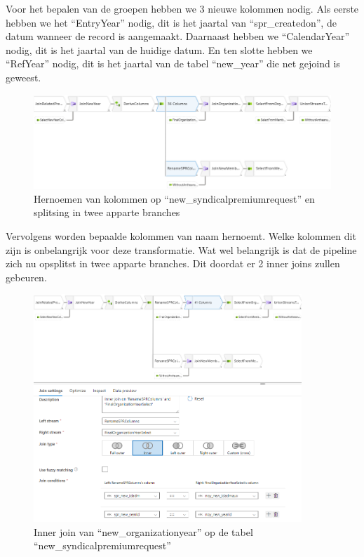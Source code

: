 Voor het bepalen van de groepen hebben we 3 nieuwe kolommen nodig. Als eerste hebben we het ``EntryYear'' nodig, dit is het jaartal van ``spr\_createdon'', de datum wanneer de record is aangemaakt. Daarnaast hebben we ``CalendarYear'' nodig, dit is het jaartal van de huidige datum. En ten slotte hebben we ``RefYear'' nodig, dit is het jaartal van de tabel ``new\_year'' die net gejoind is geweest.

\begin{figure}[H]
    \centering
    \includegraphics[width=1\textwidth]{./graphics/adf/bepalen_groep_3.png}
    \caption{Hernoemen van kolommen op ``new\_syndicalpremiumrequest'' en splitsing in twee apparte branches}
\end{figure}

Vervolgens worden bepaalde kolommen van naam hernoemt. Welke kolommen dit zijn is onbelangrijk voor deze transformatie. Wat wel belangrijk is dat de pipeline zich nu opsplitst in twee apparte branches. Dit doordat er 2 inner joins zullen gebeuren.

\begin{figure}[H]
    \centering
    \includegraphics[width=0.9\textwidth]{./graphics/adf/bepalen_groep_4.png}
    \caption{Inner join van ``new\_organizationyear'' op de tabel ``new\_syndicalpremiumrequest''}
\end{figure}

